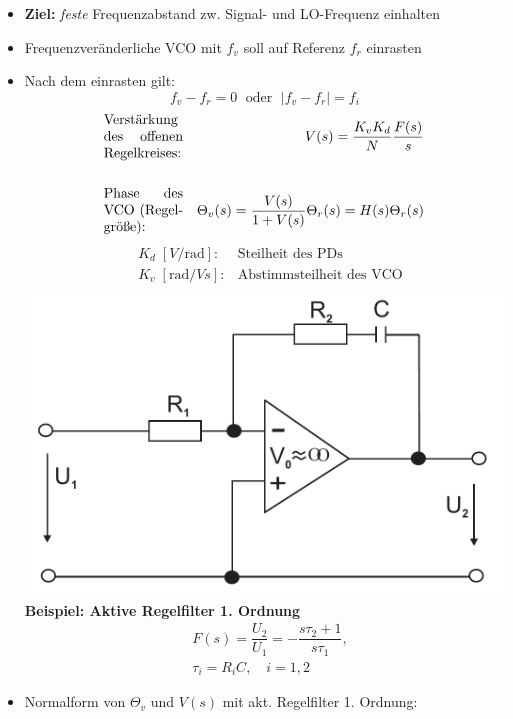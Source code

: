 \begin{itemize}
    \itemsep0pt
    \item \textbf{Ziel:} \textit{feste} Frequenzabstand zw. Signal- und LO-Frequenz einhalten
    \item Frequenzveränderliche VCO mit $f_v$ soll auf Referenz $f_r$ einrasten
    \item Nach dem einrasten gilt:
        \begin{equation*}
            f_v - f_r = 0\;\text{ oder }\;|f_v - f_r| = f_i
        \end{equation*}
    \begin{align*}
        &\parbox{2cm}{Verstärkung des offenen Regelkreises:} &V(s) = \dfrac{K_v K_d}{N} \dfrac{F(s)}{s}\\\\
        &\parbox{2cm}{Phase des VCO (Regelgröße):} &\Theta_v(s) = \dfrac{V(s)}{1 + V(s)}\Theta_r(s) = H(s)\Theta_r(s)\\
    \end{align*}
    \begin{align*}
        &K_d\;[V/\mathrm{rad}]: &\text{Steilheit des PDs}\\
        &K_v\;[\mathrm{rad}/Vs]: &\text{Abstimmsteilheit des VCO}\\
    \end{align*}
    \includegraphics[width=.22\paperheight]{content/hfmess/pictures/pll_filter.png}\\
    \textbf{Beispiel: Aktive Regelfilter 1. Ordnung}
    \begin{align*}
        &F(s) = \dfrac{U_2}{U_1} = - \dfrac{s\tau_2 + 1}{s\tau_1},\\
        &\tau_i = R_i C, \quad i = 1,2
    \end{align*}
    \item Normalform von $\Theta_v$ und $V(s)$ mit akt. Regelfilter 1. Ordnung:
\end{itemize}
